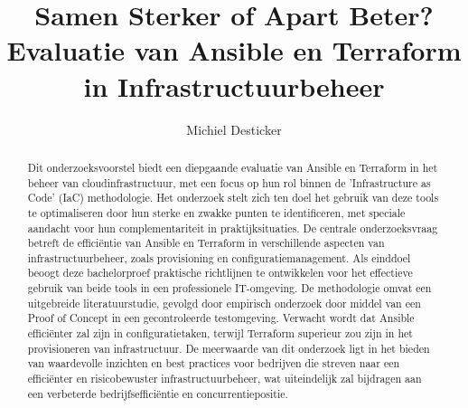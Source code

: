 \documentclass{hogent-article}
\title{Samen Sterker of Apart Beter? Evaluatie van Ansible en Terraform in Infrastructuurbeheer}
\author{Michiel Desticker}
\begin{document}
\begin{abstract}
  
  Dit onderzoeksvoorstel biedt een diepgaande evaluatie van Ansible en Terraform in het beheer van cloudinfrastructuur, met een focus op hun rol binnen de 'Infrastructure as Code' (IaC) methodologie. Het onderzoek stelt zich ten doel het gebruik van deze tools te optimaliseren door hun sterke en zwakke punten te identificeren, met speciale aandacht voor hun complementariteit in praktijksituaties. De centrale onderzoeksvraag betreft de efficiëntie van Ansible en Terraform in verschillende aspecten van infrastructuurbeheer, zoals provisioning en configuratiemanagement. Als einddoel beoogt deze bachelorproef praktische richtlijnen te ontwikkelen voor het effectieve gebruik van beide tools in een professionele IT-omgeving. De methodologie omvat een uitgebreide literatuurstudie, gevolgd door empirisch onderzoek door middel van een Proof of Concept in een gecontroleerde testomgeving. Verwacht wordt dat Ansible efficiënter zal zijn in configuratietaken, terwijl Terraform superieur zou zijn in het provisioneren van infrastructuur. De meerwaarde van dit onderzoek ligt in het bieden van waardevolle inzichten en best practices voor bedrijven die streven naar een efficiënter en risicobewuster infrastructuurbeheer, wat uiteindelijk zal bijdragen aan een verbeterde bedrijfsefficiëntie en concurrentiepositie.
\end{abstract}

\tableofcontents



\printbibliography[heading=bibintoc]
\end{document}
